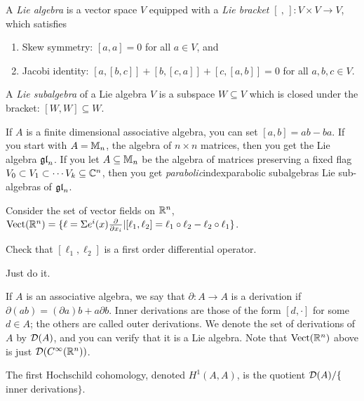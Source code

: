  \begin{definition}
   A \emph{Lie algebra} is a vector space $V$ equipped with a
   \emph{Lie bracket} $[\ ,\,]:V\times V\to V$, which satisfies
   \begin{enumerate}
     \item Skew symmetry: $[a,a]=0$ for all $a\in V$, and

     \item Jacobi identity: $[a,[b,c]]+[b,[c,a]]+[c,[a,b]]=0$
     for all $a,b,c\in V$.
   \end{enumerate}
   A \emph{Lie subalgebra} of a Lie algebra $V$ is a subspace $W\subseteq V$ which is
   closed under the bracket: $[W,W]\subseteq W$.
 \end{definition}

 \begin{example}
   If $A$ is a finite dimensional associative algebra, you can set $[a,b]=ab-ba$. If
   you start with $A=\mathbb{M}_n$, the algebra of $n\times n$ matrices, then you get the Lie
   algebra $\mathfrak{gl}_n$. If you let $A\subseteq \mathbb{M}_n$ be the algebra
   of matrices preserving a fixed flag $V_0\subset V_1\subset \cdots V_k \subseteq
   \mathbb{C}^n$, then you get \emph{parabolic}index{parabolic subalgebras} Lie sub-algebras
   of $\mathfrak{gl}_n$.
 \end{example}

 \begin{example}
   Consider the set of vector fields on $\mathbb{R}^n$, $\mathrm{Vect}(\mathbb{R}^n) = \{
   \ell=\Sigma e^i(x)\frac{\partial }{\partial x_i} | [\ell_1,\ell_2]=\ell_1\circ
   \ell_2-\ell_2\circ\ell_1\}$.
   \begin{exercise}
     Check that $[\ell_1,\ell_2]$ is a first order differential operator.
     \begin{solution}
       Just do it.
     \end{solution}
   \end{exercise}
 \end{example}
 \begin{example}
   If $A$ is an associative algebra, we say that $\partial:A\to A$ is a derivation if
   $\partial(ab)=(\partial a)b+a\partial b$. Inner derivations are those of the form
   $[d,\cdot ]$ for some $d\in A$; the others are called outer derivations. We denote
   the set of derivations of $A$ by $\mathcal{D}(A)$, and you can verify that it is a Lie algebra.
   Note that $\mathrm{Vect}(\mathbb{R}^n)$ above is just $\mathcal{D}(C^\infty(\mathbb{R}^n))$.
 \end{example}
 The first Hochschild cohomology, denoted $H^1(A,A)$, is
 the quotient $\mathcal{D}(A)/\{$inner derivations$\}$.


